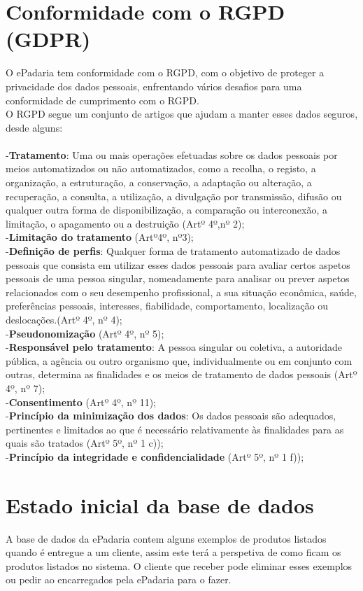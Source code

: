 \section{Conformidade com o RGPD (GDPR)}
O ePadaria tem conformidade com o RGPD, com o objetivo de proteger a privacidade dos dados pessoais, enfrentando vários desafios para uma conformidade de cumprimento com o RGPD.\\
O RGPD segue um conjunto de artigos que ajudam a manter esses dados seguros, desde alguns:\\
\\-\textbf{Tratamento}: Uma ou mais operações efetuadas sobre os dados pessoais por meios automatizados ou não automatizados, como a recolha, o registo, a organização, a estruturação, a
conservação, a adaptação ou alteração, a recuperação, a consulta, a utilização,
a divulgação por transmissão, difusão ou qualquer outra forma de
disponibilização, a comparação ou interconexão, a limitação, o apagamento
ou a destruição (Artº 4º,nº 2);\\
-\textbf{Limitação do tratamento} (Artº4º, nº3);\\
-\textbf{Definição de perfis}: Qualquer forma de tratamento automatizado de dados pessoais que consista
em utilizar esses dados pessoais para avaliar certos aspetos pessoais de uma
pessoa singular, nomeadamente para analisar ou prever aspetos relacionados
com o seu desempenho profissional, a sua situação econômica, saúde,
preferências pessoais, interesses, fiabilidade, comportamento, localização ou
deslocações.(Artº 4º, nº 4); \\
-\textbf{Pseudonomização} (Artº 4º, nº 5);\\
-\textbf{Responsável pelo tratamento}: A pessoa singular ou coletiva, a autoridade pública, a agência ou outro organismo que, individualmente ou em conjunto com outras, determina as finalidades e os meios de tratamento de dados pessoais (Artº 4º, nº 7); \\
-\textbf{Consentimento} (Artº 4º, nº 11);\\
-\textbf{Princípio da minimização dos dados}: Os dados pessoais são adequados, pertinentes e limitados ao que é necessário relativamente às finalidades para as quais são tratados (Artº 5º, nº 1 c));\\
-\textbf{Princípio da integridade e confidencialidade} (Artº 5º, nº 1 f));\\

\section{Estado inicial da base de dados}
A base de dados da ePadaria contem alguns exemplos de produtos listados quando é entregue a um cliente, assim este terá a perspetiva de como ficam os produtos listados no sistema. O cliente que receber pode eliminar esses exemplos ou pedir ao encarregados pela ePadaria para o fazer.

